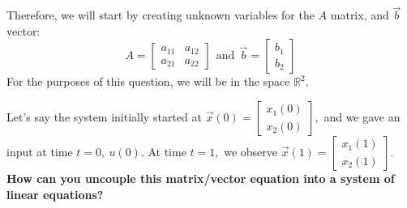 Therefore, we will start by creating unknown variables for the $A$ matrix, and $\vec{b}$ vector:
\begin{equation}
A = \begin{bmatrix} a_{11} & a_{12} \\ a_{21} & a_{22} \end{bmatrix} \ \ \text{and} \ \ \vec{b} = \begin{bmatrix} b_{1} \\ b_{2} \end{bmatrix}
\end{equation}
For the purposes of this question, we will be in the space $\mathbb{R}^2.$

\begin{enumerate}
  \qitem Let's say the system initially started at $\vec{x}(0) = \begin{bmatrix} x_{1}(0) \\ x_{2}(0) \end{bmatrix},$ and we gave an input at time $t = 0, \ u(0).$ 
  At time $t = 1,$ we observe $\vec{x}(1) = \begin{bmatrix} x_{1}(1) \\ x_{2}(1) \end{bmatrix}.$
  \textbf{How can you uncouple this matrix/vector equation into a system of linear equations?}



\end{enumerate}
